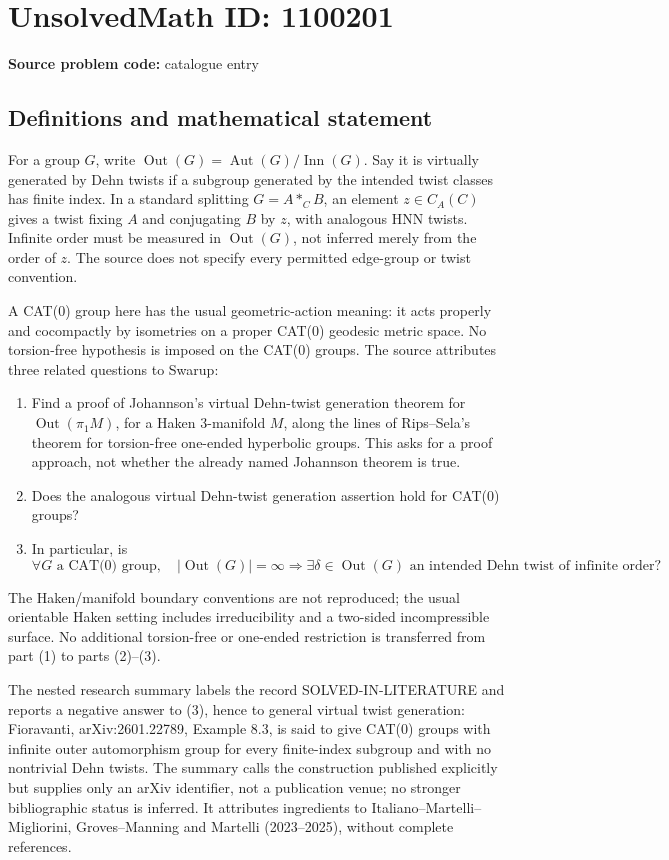 \documentclass[11pt]{article}
\begin{document}
\section*{UnsolvedMath ID: 1100201}
\textbf{Source problem code:} catalogue entry
\subsection{Definitions and mathematical statement}
For a group \(G\), write \(\operatorname{Out}(G)=\operatorname{Aut}(G)/\operatorname{Inn}(G)\). Say it is virtually generated by Dehn twists if a subgroup generated by the intended twist classes has finite index. In a standard splitting \(G=A*_C B\), an element \(z\in C_A(C)\) gives a twist fixing \(A\) and conjugating \(B\) by \(z\), with analogous HNN twists. Infinite order must be measured in \(\operatorname{Out}(G)\), not inferred merely from the order of \(z\). The source does not specify every permitted edge-group or twist convention.

A CAT(0) group here has the usual geometric-action meaning: it acts properly and cocompactly by isometries on a proper CAT(0) geodesic metric space. No torsion-free hypothesis is imposed on the CAT(0) groups. The source attributes three related questions to Swarup:
\begin{enumerate}
\item Find a proof of Johannson's virtual Dehn-twist generation theorem for \(\operatorname{Out}(\pi_1M)\), for a Haken 3-manifold \(M\), along the lines of Rips--Sela's theorem for torsion-free one-ended hyperbolic groups. This asks for a proof approach, not whether the already named Johannson theorem is true.
\item Does the analogous virtual Dehn-twist generation assertion hold for CAT(0) groups?
\item In particular, is
\[
\forall G\text{ a CAT(0) group},\quad
|\operatorname{Out}(G)|=\infty
\Longrightarrow\exists\delta\in\operatorname{Out}(G)\text{ an intended Dehn twist of infinite order}?
\]
\end{enumerate}
The Haken/manifold boundary conventions are not reproduced; the usual orientable Haken setting includes irreducibility and a two-sided incompressible surface. No additional torsion-free or one-ended restriction is transferred from part (1) to parts (2)--(3).

The nested research summary labels the record SOLVED-IN-LITERATURE and reports a negative answer to (3), hence to general virtual twist generation: Fioravanti, arXiv:2601.22789, Example 8.3, is said to give CAT(0) groups with infinite outer automorphism group for every finite-index subgroup and with no nontrivial Dehn twists. The summary calls the construction published explicitly but supplies only an arXiv identifier, not a publication venue; no stronger bibliographic status is inferred. It attributes ingredients to Italiano--Martelli--Migliorini, Groves--Manning and Martelli (2023--2025), without complete references.
\end{document}
